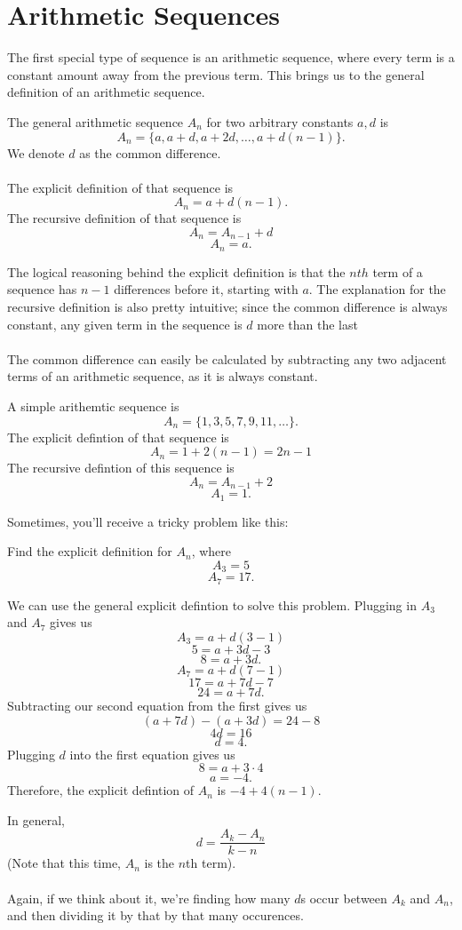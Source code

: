 \section{Arithmetic Sequences}
The first special type of sequence is an arithmetic sequence, 
where every term is a constant amount away from the previous term. This brings us to the general definition of an arithmetic sequence.
\begin{definition}
    The general arithmetic sequence $A_n$ for two arbitrary constants $a, d$ is 
    \[A_n=\{a, a+d, a+2d, \dots, a+d(n-1)\}.\]
    We denote $d$ as the common difference.\\\\
    The explicit definition of that sequence is
    \[A_n=a+d(n-1).\]
    The recursive definition of that sequence is
    \[A_n=A_{n-1}+d\]
    \[A_n=a.\]
\end{definition}
The logical reasoning behind the explicit definition is that the $nth$ term of a sequence has $n-1$ differences before it, starting with $a$. The explanation for the recursive definition is also pretty intuitive; since the common difference is always constant, any given term in the sequence is $d$ more than the last \\\\
The common difference can easily be calculated by subtracting any two adjacent terms of an arithmetic sequence, as it is always constant.
\begin{example}
    A simple arithemtic sequence is 
    \[A_n=\{1, 3, 5, 7, 9, 11,\dots\}.\]
    The explicit defintion of that sequence is 
    \[A_n=1+2(n-1)=2n-1\]
    The recursive defintion of this sequence is
    \[A_n=A_{n-1}+2\]
    \[A_1=1.\]
\end{example}
Sometimes, you'll receive a tricky problem like this:
\begin{problem}
    Find the explicit definition for $A_n$, where
    \[A_3=5\]
    \[A_7=17.\]
\end{problem}
\begin{solution}
    We can use the general explicit defintion to solve this problem. Plugging in $A_3$ and $A_7$ gives us
    \[A_3=a+d(3-1)\]
    \[5=a+3d-3\]
    \[8=a+3d.\]
    \[A_7=a+d(7-1)\]
    \[17=a+7d-7\]
    \[24=a+7d.\]
    Subtracting our second equation from the first gives us
    \[(a+7d)-(a+3d)=24-8\]
    \[4d=16\]
    \[d=4.\]
    Plugging $d$ into the first equation gives us 
    \[8=a+3\cdot4\]
    \[a=-4.\]
    Therefore, the explicit defintion of $A_n$ is $-4+4(n-1)$.
\end{solution}
In general,
\[d=\frac{A_k-A_n}{k-n}\]
(Note that this time, $A_n$ is the $n$th term).\\\\
Again, if we think about it, we're finding how many $d$s occur between $A_k$ and $A_n$, and then dividing it by that by that many occurences. 

